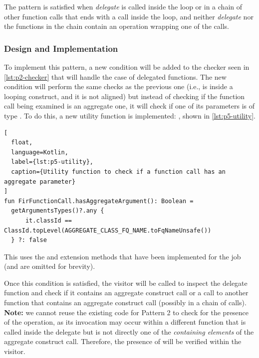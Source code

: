 \documentclass[12pt,a4paper,openright,twoside]{book}
\begin{document}
The pattern is satisfied when \emph{delegate} is called inside the loop or in a
chain of other function calls that ends with a call inside the loop, and neither
\emph{delegate} nor the functions in the chain contain an 
operation wrapping one of the calls.

\subsubsection{Design and Implementation}

To implement this pattern, a new condition will be added to the checker seen in
\cref{lst:p2-checker} that will handle the case of delegated functions. The new
condition will perform the same checks as the previous one (i.e., is inside a
looping construct, and it is not aligned) but instead of checking if the
function call being examined is an aggregate one, it will check if one of its
parameters is of type . To do this, a new utility function is
implemented: , shown in \cref{lst:p5-utility}.
%
\begin{lstlisting}[
  float, 
  language=Kotlin,
  label={lst:p5-utility},
  caption={Utility function to check if a function call has an aggregate parameter}
]
fun FirFunctionCall.hasAggregateArgument(): Boolean =
  getArgumentsTypes()?.any {
      it.classId == ClassId.topLevel(AGGREGATE_CLASS_FQ_NAME.toFqNameUnsafe())
  } ?: false 
\end{lstlisting}
%
This uses the  and 
extension methods that have been implemented for the job (and are omitted for
brevity). 

Once this condition is satisfied, the visitor will be called to inspect the
delegate function and check if it contains an aggregate construct call or a call
to another function that contains an aggregate construct call (possibly in a
chain of calls). \textbf{Note:} we cannot reuse the existing code for Pattern 2
to check for the presence of the  operation, as its invocation
may occur within a different function that is called inside the delegate but is
not directly one of the \emph{containing elements} of the aggregate construct
call. Therefore, the presence of  will be verified within the
visitor.
\end{document}
